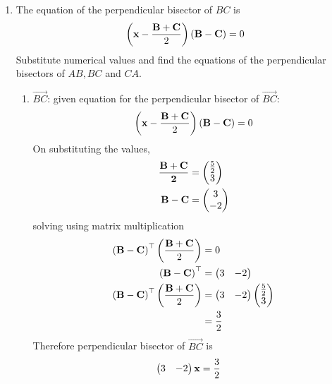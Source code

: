 \documentclass[11pt]{book}
\begin{document}
\begin{enumerate}[label=\thesection.\arabic*.,ref=\thesection.\theenumi]

\item The equation of the perpendicular bisector of $BC$ is
\begin{align}
\label{eq:tri-perp-bisect}
\brak{\vec{x}-\frac{\vec{B}+\vec{C}}{2}}\brak{\vec{B}-\vec{C}} = 0
\end{align}
Substitute numerical values and find the equations of the perpendicular bisectors of $AB, BC$ and $CA$.
\\	\solution
\begin{enumerate}
    \item $\vec{BC}$: given equation for the perpendicular bisector of $\vec{BC}$:
\begin{align}
    \left(\mathbf{x}-\frac{\mathbf{B}+\mathbf{C}}{2}\right)\left(\mathbf{B}-\mathbf{C}\right) = 0
\end{align}
On substituting the values,
\begin{align}
    \mathbf{\frac{\mathbf{B}+\mathbf{C}}{2}} &= \begin{pmatrix}\frac{5}{2} \\ 3\end{pmatrix} \\
\mathbf{B}-\mathbf{C} &= \begin{pmatrix}3 \\ -2\end{pmatrix} \\
\end{align}
solving using matrix multiplication
\begin{align}
\left(\mathbf{B}-\mathbf{C}\right)^{\top}\left(\frac{\mathbf{B}+\mathbf{C}}{2}\right)&=0 \\
\left(\mathbf{B}-\mathbf{C}\right)^{\top} &= \begin{pmatrix}3 & -2\end{pmatrix} \\
\left(\mathbf{B}-\mathbf{C}\right)^{\top}\left(\frac{\mathbf{B}+\mathbf{C}}{2}\right)&=\begin{pmatrix}3 & -2\end{pmatrix}\begin{pmatrix}\frac{5}{2} \\ 3\end{pmatrix}\\
&= \frac{3}{2}
\end{align}
Therefore perpendicular bisector of $\vec{BC}$ is
\begin{align}
    \begin{pmatrix}3 & -2\end{pmatrix}\mathbf{x}&= \frac{3}{2}
\end{align}


\end{enumerate}
\end{enumerate}
\end{document}
